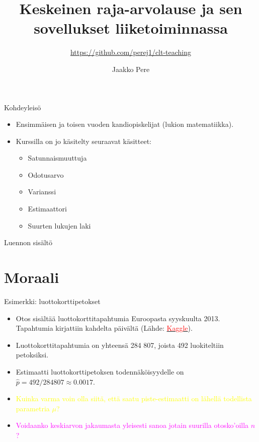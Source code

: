\documentclass{beamer}
\title{Keskeinen raja-arvolause ja sen sovellukset liiketoiminnassa}
\subtitle{\url{https://github.com/perej1/clt-teaching}}
\author{Jaakko Pere}
\date{\displaydate{date}}
\begin{document}
\frame{\titlepage}


\begin{frame}{Kohdeyleisö}
  \begin{itemize}
    \item Ensimmäisen ja toisen vuoden kandiopiskelijat (lukion matematiikka).
    \pause
    \item Kurssilla on jo käsitelty seuraavat käsitteet:
    \begin{itemize}
      \item Satunnaismuuttuja
      \item Odotusarvo
      \item Varianssi
      \item Estimaattori
      \item Suurten lukujen laki
    \end{itemize}
  \end{itemize}
\end{frame}


\begin{frame}{Luennon sisältö}
  \tableofcontents
\end{frame}


\section{Moraali}


\begin{frame}{Esimerkki: luottokorttipetokset}
  \begin{itemize}
    \item Otos sisältää luottokorttitapahtumia Euroopasta syyskuulta 2013.
    Tapahtumia kirjattiin kahdelta päivältä (Lähde:
    \href{https://www.kaggle.com/datasets/mlg-ulb/creditcardfraud?resource=download}{\textcolor{red}{Kaggle}}).
    \pause
    \item Luottokorttitapahtumia on yhteensä 284 807, joista 492 luokiteltiin
    petoksiksi.
    \pause
    \item Estimaatti luottokorttipetoksen todennäköisyydelle on $\hat p = 492 /
    284 807\approx 0.0017$.
    \pause
    \item \textcolor{yellow}{Kuinka varma voin olla siitä, että saatu
    piste-estimaatti on lähellä todellista parametria $\mu$?}
    \pause
    \item \textcolor{magenta}{Voidaanko keskiarvon jakaumasta yleisesti sanoa
    jotain suurilla otosko'oilla $n$?}
  \end{itemize}
\end{frame}
\end{document}
